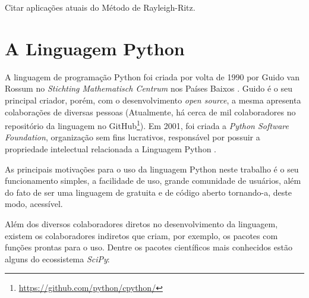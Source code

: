 \documentclass[
	12pt,				%
	openright,			%
    twoside,			%
	a4paper,			%
	english,			%
	french,				%
	spanish,			%
	brazil				%
	]{abntex2}
\numberwithin{lema}{chapter}
\numberwithin{teorema}{chapter}
\numberwithin{definicao}{chapter}
\numberwithin{exemplo}{chapter}
\numberwithin{figure}{chapter}
\begin{document}

{\color{red}Citar aplicações atuais do Método de Rayleigh-Ritz.}

\section{A Linguagem Python}



A linguagem de programação Python foi criada por volta de 1990 por Guido van Rossum no \textit{Stichting Mathematisch Centrum} nos Países Baixos \cite{Python_history}. Guido é o seu principal criador, porém, com o desenvolvimento \textit{open source}, a mesma apresenta colaborações de diversas pessoas (Atualmente, há cerca de mil colaboradores no repositório da linguagem no GitHub\footnote{\url{https://github.com/python/cpython/}}). Em 2001, foi criada a \textit{Python Software Foundation}, organização sem fins lucrativos, responsável por possuir a propriedade intelectual relacionada a Linguagem Python \cite{Python_history}.

As principais motivações para o uso da linguagem Python neste trabalho é o seu funcionamento simples, a facilidade de uso, grande comunidade de usuários, além do fato de ser uma linguagem de gratuita e de código aberto tornando-a, deste modo, acessível.

Além dos diversos colaboradores diretos no desenvolvimento da linguagem, existem os colaboradores indiretos que criam, por exemplo, os pacotes com funções prontas para o uso. Dentre os pacotes científicos mais conhecidos estão alguns do ecossistema \textit{SciPy}:
\end{document}
